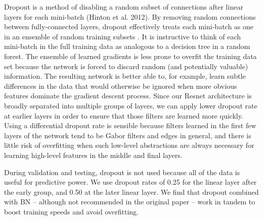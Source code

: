 \documentclass[fleqn,usenatbib]{mnras}
\begin{document}
Dropout is a method of disabling a random subset of connections after linear layers for each mini-batch (Hinton et al. 2012).
By removing random connections between fully-connected layers, dropout effectively treats each mini-batch as one in an ensemble of random training subsets .
It is instructive to think of each mini-batch in the full training data as analogous to a decision tree in a random forest.
The ensemble of learned gradients is less prone to overfit the training data set because the network is forced to discard random (and potentially valuable) information.
The resulting network is better able to, for example, learn subtle differences in the data that would otherwise be ignored when more obvious features dominate the gradient descent process.
Since our Resnet architecture is broadly separated into multiple groups of layers, we can apply lower dropout rate at earlier layers in order to ensure that those filters are learned more quickly.
Using a differential dropout rate is sensible because filters learned in the first few layers of the network tend to be Gabor filters and edges in general, and there is little risk of overfitting when such low-level abstractions are always necessary for learning high-level features in the middle and final layers.

During validation and testing, dropout is not used because all of the data is useful for predictive power.
We use dropout rates of 0.25 for the linear layer after the early group, and 0.50 at the later linear layer.
We find that dropout combined with BN -- although not recommended in the original paper -- work in tandem to boost training speeds and avoid overfitting.



\bsp	%
\label{lastpage}
\end{document}
